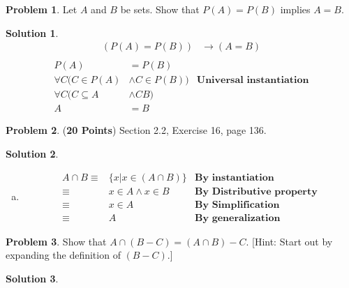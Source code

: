 \documentclass{article}
\theoremstyle{definition}
\newtheorem{problem}{Problem}
\newtheorem*{solution}{Solution}
\begin{document}
\begin{problem} Let $A$ and $B$ be sets. Show that $P(A)=P(B)$ implies $A=B$.
\end{problem}
\begin{solution}
\begin{align*}
  (P(A)=P(B))&\rightarrow(A=B) \\
\end{align*}
\begin{align*}
  P(A) &= P(B) \\
  \forall C(C \in P(A) &\land C \in P(B)) &\textbf{Universal instantiation} \\
  \forall C(C \subseteq A &\land C  B) \\
  A &= B
\end{align*}
\end{solution}

\begin{problem} (\textbf{20 Points}) Section 2.2, Exercise 16, page 136.
\end{problem}
\begin{solution}
\begin{enumerate}[a)]
  \item
  \begin{align*}
    A \cap B \equiv& \{x | x \in (A \cap B) \} &\textbf{By instantiation} \\
    \equiv& x \in A \land x \in B &\textbf{By Distributive property} \\
    \equiv& x \in A &\textbf{By Simplification} \\
    \equiv& A &\textbf{By generalization}  
  \end{align*}
\end{enumerate}
\end{solution}

\begin{problem} Show that $A\cap (B - C) = (A\cap B) - C$.
[Hint: Start out by expanding the definition of $(B - C)$.]
\end{problem}
\begin{solution}
\end{solution}
\end{document}
